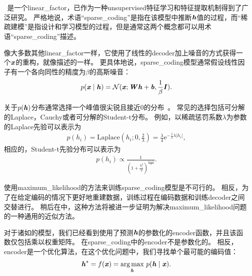 \section{}
\label{sec:sparse_coding}


~\citep{Olshausen+Field-1996}是一个\gls{linear_factor}，已作为一种\gls{unsupervised}特征学习和特征提取机制得到了广泛研究。
严格地说，术语``\gls{sparse_coding}''是指在该模型中推断$\boldsymbol{\mathit{h}}$值的过程，而``稀疏建模''是指设计和学习模型的过程，但是通常这两个概念都可以用术语``\gls{sparse_coding}''描述。

像大多数其他\gls{linear_factor}一样，它使用了线性的\gls{decoder}加上噪音的方式获得一个$\boldsymbol{\mathit{x}}$的重构，就像描述的一样。
更具体地说，\gls{sparse_coding}模型通常假设线性因子有一个各向同性的精度为$\beta$的高斯噪音：
\begin{align}
\label{eqn:1312}
p(\boldsymbol{\mathit{x}}\mid \boldsymbol{\mathit{h}}) = \mathcal{N}
(\boldsymbol{\mathit{x}};\boldsymbol{\mathit{W}}\boldsymbol{\mathit{h}} + \boldsymbol{\mathit{b}} ,\frac{1}{\beta}\boldsymbol{\mathit{I}}).
\end{align}


关于$p(\boldsymbol{\mathit{h}})$分布通常选择一个峰值很尖锐且接近$0$的分布~\citep{Olshausen+Field-1996}。
常见的选择包括可分解的Laplace，Cauchy或者可分解的Student-t分布。
例如，以稀疏惩罚系数$\lambda$为参数的Laplace先验可以表示为
\begin{align}
\label{eqn:1313}
p(h_i) = \text{Laplace}(h_i;0,\frac{2}{\lambda}) = \frac{\lambda}{4} \text{e}^{ -\frac{1}{2}\lambda \vert h_i\vert},
\end{align}
相应的，Student-t先验分布可以表示为
\begin{align}
\label{eqn:1314}
p(h_i)\propto \frac{1}{(1+\frac{h_i^2}{\nu})^{\frac{\nu+1}{2}}}.
\end{align}

使用\gls{maximum_likelihood}的方法来训练\gls{sparse_coding}模型是不可行的。
相反，为了在给定编码的情况下更好地重建数据，训练过程在编码数据和训练\gls{decoder}之间交替进行。
稍后在中，这种方法将被进一步证明为解决\gls{maximum_likelihood}问题的一种通用的近似方法。

对于诸如的模型，我们已经看到使用了预测$\boldsymbol{\mathit{h}}$的参数化的\gls{encoder}函数，并且该函数仅包括乘以权重矩阵。
在\gls{sparse_coding}中的\gls{encoder}不是参数化的。
相反，\gls{encoder}是一个优化算法，在这个优化问题中，我们寻找单个最可能的编码值：
\begin{align}
\label{eqn:1315}
\boldsymbol{\mathit{h}}^* = f(\boldsymbol{\mathit{x}}) = \underset{\boldsymbol{\mathit{h}}}{\arg\max}\  p(\boldsymbol{\mathit{h}}\mid\boldsymbol{\mathit{x}}).
\end{align}


